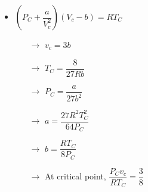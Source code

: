 \documentclass[8pt]{article}
\begin{document}
	\begin{itemize}
		\item $\boxed{\left(P_C+\dfrac{a}{V_c^2}\right)(V_c-b) = RT_C}$
			\begin{itemize}
				\item[$\rightarrow$] $v_c = 3b$
				\item[$\rightarrow$] $T_C = \dfrac{8}{27Rb}$
				\item[$\rightarrow$] $P_C = \dfrac{a}{27b^2}$
				\item[$\rightarrow$] $a = \dfrac{27R^2T_C^2}{64P_C}$
				\item[$\rightarrow$] $b = \dfrac{RT_C}{8P_C}$
				\item[$\rightarrow$] At critical point, $\dfrac{P_Cv_c}{RT_C} = \dfrac{3}{8}$
			\end{itemize}
	\end{itemize}\hrulefill\\\\\
\end{document}
